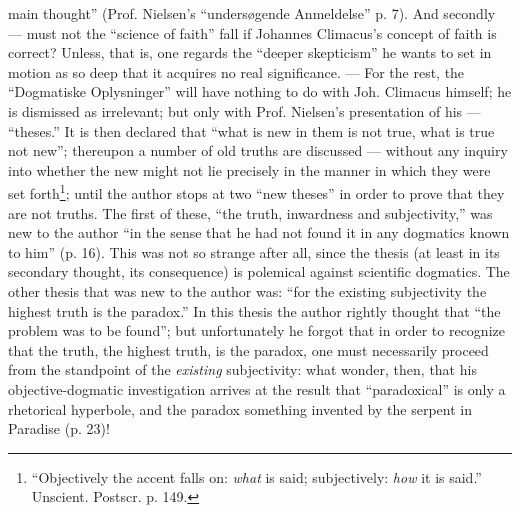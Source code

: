 \documentclass[12pt,a4paper]{book}
\newcommand{\opage}[1]{\marginnote{\footnotesize\textit{[#1]}}}
\begin{document}
main thought'' (Prof. Nielsen's ``undersøgende Anmeldelse'' p. 7).
And secondly --- must not the ``science of faith'' fall if
Johannes Climacus's concept of faith is correct? Unless,
that is, one regards the ``deeper skepticism'' he wants to set in
motion as so deep that it acquires no real significance.
--- For the rest, the ``Dogmatiske Oplysninger'' will
have nothing to do with Joh. Climacus himself; he is dismissed as
irrelevant; but only with Prof. Nielsen's presentation of
his --- ``theses.'' It is then declared that ``what is new in them
is not true, what is true not new''; thereupon a number of
old truths are discussed --- without any inquiry into whether the new
might not lie precisely in the manner in which they were set forth\footnote{``Objectively the accent falls on: \emph{what} is said; subjectively: \emph{how} it
is said.'' Unscient. Postscr. p. 149.};
until the author stops at two ``new theses'' in order to prove
that they are not truths. The first of these, ``the truth,
inwardness and subjectivity,'' was new to the author ``in the
\opage{33}\setcounter{footnote}{0}%
sense that he had not found it in any dogmatics known to him''
(p. 16). This was not so strange after all, since
the thesis (at least in its secondary thought, its consequence) is
polemical against scientific dogmatics. The other thesis
that was new to the author was: ``for the existing subjectivity
the highest truth is the paradox.'' In this thesis the
author rightly thought that ``the problem was to be found''; but
unfortunately he forgot that in order to recognize that the truth,
the highest truth, is the paradox, one must necessarily proceed
from the standpoint of the \emph{existing} subjectivity: what
wonder, then, that his objective-dogmatic investigation arrives at
the result that ``paradoxical'' is only a rhetorical hyperbole, and
the paradox something invented by the serpent in Paradise
(p. 23)!
\end{document}
